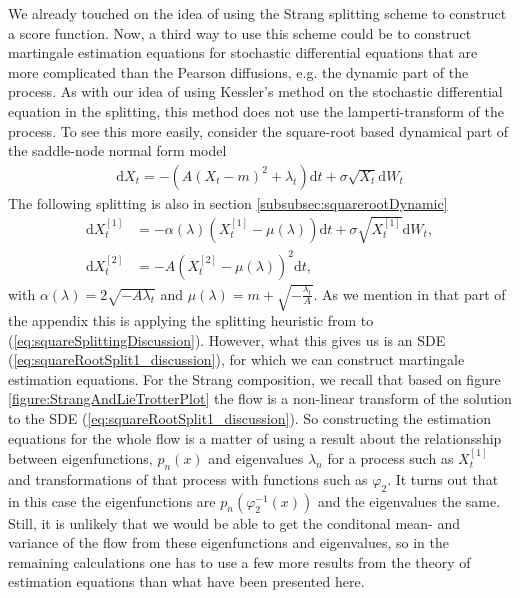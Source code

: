 We already touched on the idea of using the Strang splitting scheme to construct a score function. Now, a third way to use this scheme could be to construct martingale estimation equations for stochastic differential equations that are more complicated than the Pearson diffusions, e.g. the dynamic part of the process. As with our idea of using Kessler's method on the stochastic differential equation in the splitting, this method does not use the lamperti-transform of the process. To see this more easily, consider the square-root based dynamical part of the saddle-node normal form model
\begin{align}
    \mathrm{d}X_t = -(A(X_t - m)^2 + \lambda_t)\mathrm{d}t + \sigma\sqrt{X_t}\mathrm{d}W_t \label{eq:squareSplittingDiscussion}
\end{align}  
The following splitting is also in section \ref{subsubsec:squarerootDynamic}
\begin{align}
    \mathrm{d}X_t^{[1]} &= -\alpha(\lambda)\left(X_t^{[1]} - \mu(\lambda)\right)  \mathrm{d}t + \sigma \sqrt{X_t^{[1]}} \mathrm{d}W_t, \label{eq:squareRootSplit1_discussion} \\
    \mathrm{d}X_t^{[2]} &= - A \left(X_t^{[2]} - \mu(\lambda)\right)^2 \mathrm{d}t, \label{eq:squareRootSplit2_discussion}
\end{align}
with $\alpha(\lambda) = 2\sqrt{-A\lambda_t}$ and $\mu(\lambda) = m + \sqrt{-\frac{\lambda_t}{A}}$. As we mention in that part of the appendix this is applying the splitting heuristic from \cite{SplittingSchemes} to (\ref{eq:squareSplittingDiscussion}). However, what this gives us is an SDE (\ref{eq:squareRootSplit1_discussion}), for which we can construct martingale estimation equations. For the Strang composition, we recall that based on figure \ref{figure:StrangAndLieTrotterPlot} the flow is a non-linear transform of the solution to the SDE (\ref{eq:squareRootSplit1_discussion}). So constructing the estimation equations for the whole flow is a matter of using a result about the relationsship between eigenfunctions, $p_n(x)$ and eigenvalues $\lambda_n$ for a process such as $X_t^{[1]}$ and transformations of that process with functions such as $\varphi_2$. It turns out \cite[remark on p. 41]{StatisticalMethodsForSDE} that in this case the eigenfunctions are $p_n\left(\varphi_2^{-1}(x)\right)$ and the eigenvalues the same. Still, it is unlikely that we would be able to get the conditonal mean- and variance  of the flow from these eigenfunctions and eigenvalues, so in the remaining calculations one has to use a few more results from the theory of estimation equations than what have been presented here.
